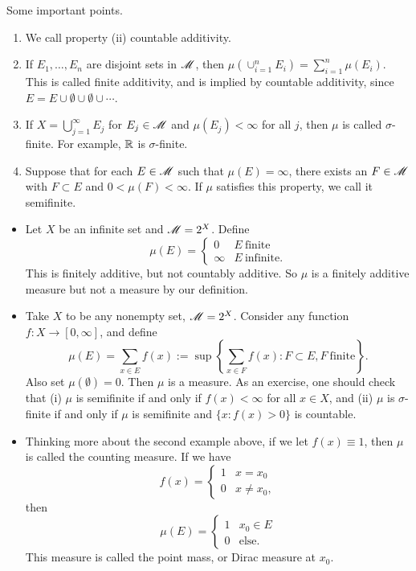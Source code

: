 \documentclass[12pt]{article} %
\begin{document}
\begin{remark}
    Some important points.
    \begin{enumerate}
        \item We call property (ii) countable additivity.
        \item If $E_1, \ldots, E_n$ are disjoint sets in $\mathscr{M}$, then $\mu\left(\cup_{i=1}^{n} E_i \right) = \sum_{i=1}^{n} \mu(E_i)$. This is called finite additivity, and is implied by countable additivity, since $E = E \cup \emptyset \cup \emptyset \cup \cdots$. 
        \item If $X = \bigcup_{j=1}^{\infty} E_j$ for $E_j \in \mathscr{M}$ and $\mu(E_j) < \infty$ for all $j$, then $\mu$ is called $\sigma$-finite. For example, $\mathbb{R}$ is $\sigma$-finite.
        \item Suppose that for each $E \in \mathscr{M}$ such that $\mu(E) = \infty$, there exists an $F \in \mathscr{M}$ with $F \subset E$ and $0 < \mu(F) < \infty$. If $\mu$ satisfies this property, we call it semifinite.
    \end{enumerate}
\end{remark}

\begin{example}[Measures]
    \begin{itemize}
        \item Let $X$ be an infinite set and $\mathscr{M} = 2^X$. Define \[\mu(E) = \begin{cases}
            0 &E \ \text{finite}\\
            \infty &E \ \text{infinite}.
        \end{cases}\] This is finitely additive, but not countably additive. So $\mu$ is a finitely additive measure but not a measure by our definition.
        \item Take $X$ to be any nonempty set, $\mathscr{M} = 2^X$. Consider any function $f : X \to [0,\infty]$, and define \[\mu(E) = \sum_{x \in E} f(x) := \sup \left\{ \sum_{x \in F} f(x) : F \subset E, F \ \text{finite}\right\}.\] Also set $\mu(\emptyset) = 0$. Then $\mu$ is a measure. As an exercise, one should check that (i) $\mu$ is semifinite if and only if $f(x) < \infty$ for all $x \in X$, and (ii) $\mu$ is $\sigma$-finite if and only if $\mu$ is semifinite and $\{x : f(x) > 0\}$ is countable. 
        \item Thinking more about the second example above, if we let $f(x) \equiv 1$, then $\mu$ is called the counting measure. If we have \[f(x) = \begin{cases}
            1 &x = x_0\\
            0 &x \neq x_0,
        \end{cases}\] then \[\mu(E) = \begin{cases}
            1 &x_0 \in E\\
            0 &\text{else}.
        \end{cases}\] This measure is called the point mass, or Dirac measure at $x_0$. 
    \end{itemize}
\end{example}
\end{document}

